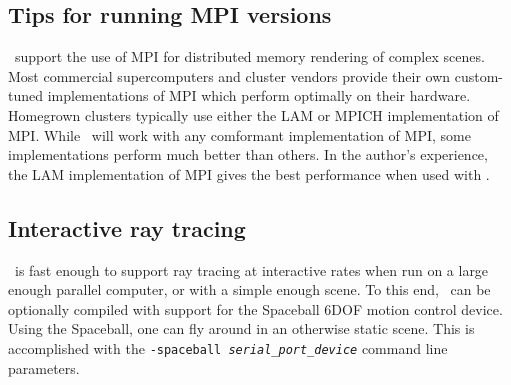 \subsection{Tips for running MPI versions}
\RAY\ support the use of MPI for distributed memory rendering
of complex scenes.  Most commercial supercomputers and cluster
vendors provide their own custom-tuned implementations of MPI
which perform optimally on their hardware.  Homegrown clusters
typically use either the LAM or MPICH implementation of MPI.
While \RAY\ will work with any comformant implementation of MPI,
some implementations perform much better than others.  In the
author's experience, the LAM implementation of MPI gives the
best performance when used with \RAY.

\subsection{Interactive ray tracing}
\RAY\ is fast enough to support ray tracing at interactive rates
when run on a large enough parallel computer, or with a simple enough
scene.  To this end, \RAY\ can be optionally compiled with support for
the Spaceball 6DOF motion control device.  Using the Spaceball, one
can fly around in an otherwise static scene.  This is accomplished
with the {\tt -spaceball {\it serial_port_device}} command line parameters.
